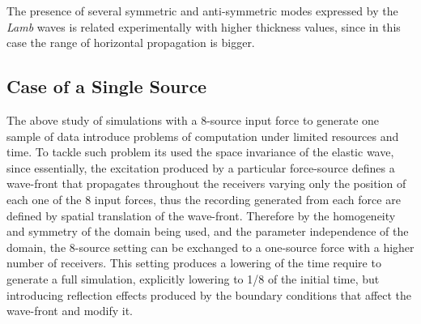 \begin{rem}
The presence of several symmetric and anti-symmetric modes expressed by the \textit{Lamb} waves is related experimentally with higher thickness values, since in this case the range of horizontal propagation is bigger.
\end{rem}


\subsection{Case of a Single Source}
The above study of simulations with a 8-source input force to generate one sample of data introduce problems of computation under limited resources and time. 
To tackle such problem its used the space invariance of the elastic wave, since essentially, the excitation produced by a particular force-source defines a wave-front that propagates throughout the receivers varying only the position of each one of the 8 input forces, thus the recording generated from each force are defined by spatial translation of the wave-front. Therefore by the homogeneity and symmetry of the domain being used, and the parameter independence of the domain, the 8-source setting can be exchanged to a one-source force with a higher number of receivers. This setting produces a lowering of the time require to generate a full simulation, explicitly lowering to 1/8 of the initial time, but introducing reflection effects produced by the boundary conditions that affect the wave-front and modify it.

